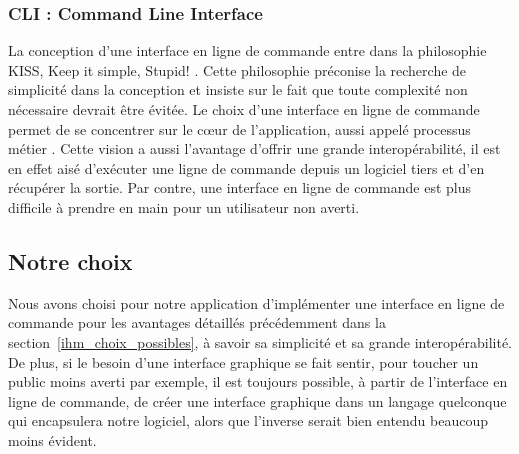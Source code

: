 		\subsubsection{CLI : \og Command Line Interface \fg{}}
			La conception d'une interface en ligne de commande entre dans la philosophie KISS, \og Keep it simple, Stupid! \fg{}. Cette philosophie préconise la recherche de simplicité dans la conception et insiste sur le fait que toute complexité non nécessaire devrait être évitée. Le choix d'une interface en ligne de commande permet de se concentrer sur le cœur de l'application, aussi appelé \og processus métier \fg{}. Cette vision a aussi l'avantage d'offrir une grande interopérabilité, il est en effet aisé d'exécuter une ligne de commande depuis un logiciel tiers et d'en récupérer la sortie. Par contre, une interface en ligne de commande est plus difficile à prendre en main pour un utilisateur non averti.  
			
	\subsection{Notre choix}
		Nous avons choisi pour notre application d'implémenter une interface en ligne de commande pour les avantages détaillés précédemment dans la section~\ref{ihm_choix_possibles}, à savoir sa simplicité et sa grande interopérabilité. De plus, si le besoin d'une interface graphique se fait sentir, pour toucher un public moins averti par exemple, il est toujours possible, à partir de l'interface en ligne de commande, de créer une interface graphique dans un langage quelconque qui encapsulera notre logiciel, alors que l'inverse serait bien entendu beaucoup moins évident.

